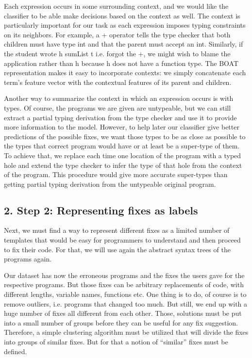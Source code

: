  Each expression occurs in some surrounding context, and we would like the classifier to be able make decisions based on the context as well. The context is particularly important for our task as each expression imposes typing constraints on its neighbors. For example, a + operator tells the type checker that both children must have type int and that the parent must accept an int. Similarly, if the student wrote h sumList t i.e. forgot the +, we might wish to blame the application rather than h because h does not have a function type. The BOAT representation makes it easy to incorporate contexts: we simply concatenate each term’s feature vector with the contextual features of its parent and children.

 Another way to summarize the context in which an expression occurs is with types. Of course, the programs we are given are untypeable, but we can still extract a partial typing derivation from the type checker and use it to provide more information to the model. However, to help later our classifier give better predictions of the possible fixes, we want those types to be as close as possible to the types that correct program would have or at least be a super-type of them. To achieve that, we replace each time one location of the program with a typed hole and extend the type checker to infer the type of that hole from the context of the program. This procedure would give more accurate super-types than getting partial typing derivation from the untypeable original program.



\subsection{2. Step 2: Representing fixes as labels}

Next, we must find a way to represent different fixes as a limited number of templates that would be easy for programmers to understand and then proceed to fix their code. For that, we will use again the abstract syntax trees of the programs again.

 Our dataset has now the erroneous programs and the fixes the users gave for the respective programs. But those fixes can be arbitrary replacements of code, with different lengths, variable names, functions etc. One thing is to do, of course is to remove outliers, i.e. programs that changed too much. But still, we end up with a huge number of fixes all different from each other. Those, solutions must be put into a small number of groups before they can be useful for any fix suggestion. Therefore, a simple clustering algorithm must be utilized that will divide the fixes into groups of similar fixes. But for that a notion of “similar” fixes must be defined.

